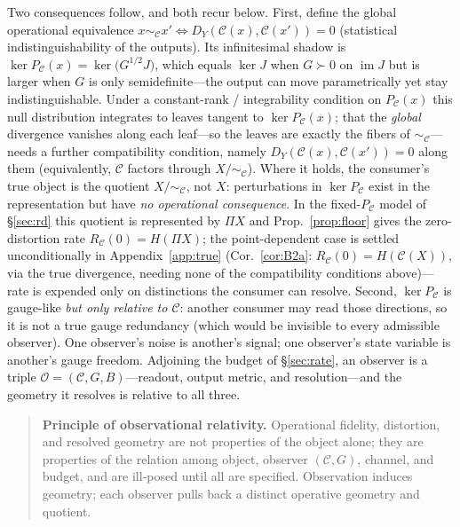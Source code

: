 \documentclass[lettersize,onecolumn]{IEEEtran}
\theoremstyle{definition}
\theoremstyle{remark}
\newcommand{\PC}{P_{\mathcal{C}}}
\begin{document}
Two consequences follow, and both recur below. First, define the global operational
equivalence $x\sim_{\mathcal{C}}x'\iff D_Y(\mathcal{C}(x),\mathcal{C}(x'))=0$
(statistical indistinguishability of the outputs). Its infinitesimal shadow is
$\ker\PC(x)=\ker\!\big(G^{1/2}J\big)$, which equals $\ker J$ when $G\succ0$ on
$\operatorname{im}J$ but is larger when $G$ is only semidefinite---the output can move
parametrically yet stay indistinguishable. Under a constant-rank / integrability
condition on $\PC(x)$ this null distribution integrates to leaves tangent to
$\ker\PC(x)$; that the \emph{global} divergence vanishes along each leaf---so the
leaves are exactly the fibers of $\sim_{\mathcal{C}}$---needs a further compatibility
condition, namely $D_Y(\mathcal{C}(x),\mathcal{C}(x'))=0$ along them (equivalently,
$\mathcal{C}$ factors through $X/\!\sim_{\mathcal{C}}$). Where it holds, the
consumer's true object is the quotient $X/\!\sim_{\mathcal{C}}$, not $X$:
perturbations in $\ker\PC$ exist in the representation but have \emph{no operational
consequence}. In the fixed-$\PC$ model of \S\ref{sec:rd} this quotient is represented
by $\Pi X$ and Prop.~\ref{prop:floor} gives the zero-distortion rate
$R_{\mathcal{C}}(0)=H(\Pi X)$; the point-dependent case is settled unconditionally in
Appendix~\ref{app:true} (Cor.~\ref{cor:B2a}: $R_{\mathcal{C}}(0)=H(\mathcal{C}(X))$,
via the true divergence, needing none of the compatibility conditions above)---rate
is expended only on distinctions the consumer can resolve. Second, $\ker\PC$ is
gauge-like \emph{but only relative to $\mathcal{C}$}: another consumer may read those
directions, so it is not a true gauge redundancy (which would be invisible to every
admissible observer). One observer's noise is another's signal; one observer's state
variable is another's gauge freedom. Adjoining the budget of \S\ref{sec:rate}, an
observer is a triple $\mathcal{O}=(\mathcal{C},G,B)$---readout, output metric, and
resolution---and the geometry it resolves is relative to all three.

\begin{quote}
\textbf{Principle of observational relativity.} Operational fidelity, distortion,
and resolved geometry are not properties of the object alone; they are properties of
the relation among object, observer $(\mathcal{C},G)$, channel, and budget, and are
ill-posed until all are specified. Observation induces geometry; each observer pulls
back a distinct operative geometry and quotient.
\end{quote}
\end{document}
